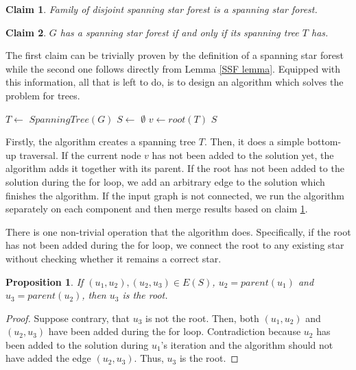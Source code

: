 \documentclass[en]{pracamgr}
\newtheorem{claim}{Claim}
\newtheorem{proposition}{Proposition}
\newcommand{\ssf}{spanning star forest}
\begin{document}
\begin{claim} \label{SSF sum}
	Family of disjoint \ssf{} is a \ssf{}.
\end{claim}

\begin{claim} \label{Spanning tree SSF}
	$G$ has a \ssf{} if and only if its spanning tree $T$ has.
\end{claim}

The first claim can be trivially proven by the definition of a \ssf{} while the second one follows directly from Lemma \ref{SSF lemma}. Equipped with this information, all that is left to do, is to design an algorithm which solves the problem for trees.

\begin{algorithm}\label{alg1}
	\KwResult{\ssf{} of $G$}
	$T \leftarrow$ $SpanningTree(G)$\;
	$S \leftarrow$ $\emptyset$\;
	$v \leftarrow root(T)$\;
	\Return $S$\;
	\caption{Obtaining a spanning star forest from a connected graph.}
\end{algorithm}

Firstly, the algorithm creates a spanning tree $T$. Then, it does a simple bottom-up traversal. If the current node $v$ has not been added to the solution yet, the algorithm adds it together with its parent. If the root has not been added to the solution during the for loop, we add an arbitrary edge to the solution which finishes the algorithm. If the input graph is not connected, we run the algorithm separately on each component and then merge results based on claim \ref{SSF sum}.

There is one non-trivial operation that the algorithm does. Specifically, if the root has not  been added during the for loop, we connect the root to any existing star without checking whether it remains a correct star.

\begin{proposition}\label{ssf root}
	If $(u_1,u_2),(u_2,u_3) \in E(S)$, $u_2 = parent(u_1)$ and $u_3=parent(u_2)$, then $u_3$ is the root.
\end{proposition}

\begin{proof}
	Suppose contrary, that $u_3$ is not the root. Then, both $(u_1,u_2)$ and $(u_2,u_3)$ have been added during the for loop. Contradiction because $u_2$ has been added to the solution during $u_1$'s iteration and the algorithm should not have added the edge $(u_2,u_3)$. Thus, $u_3$ is the root.
\end{proof}
\end{document}

